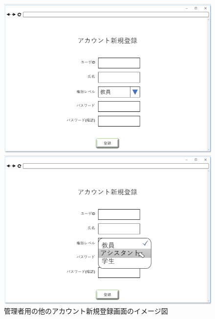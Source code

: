 \begin{figure}[htbp]
 \begin{minipage}{0.5\hsize}
  \begin{center}
   \includegraphics[width=1\linewidth,clip]{./img/07.png}
  \end{center}

 \end{minipage}
 \begin{minipage}{0.5\hsize}
  \begin{center}
   \includegraphics[width=1\linewidth,clip]{./img/08.png}
  \end{center}
 \end{minipage}
 \caption{管理者用の他のアカウント新規登録画面のイメージ図}\label{fig:07}
\end{figure}

